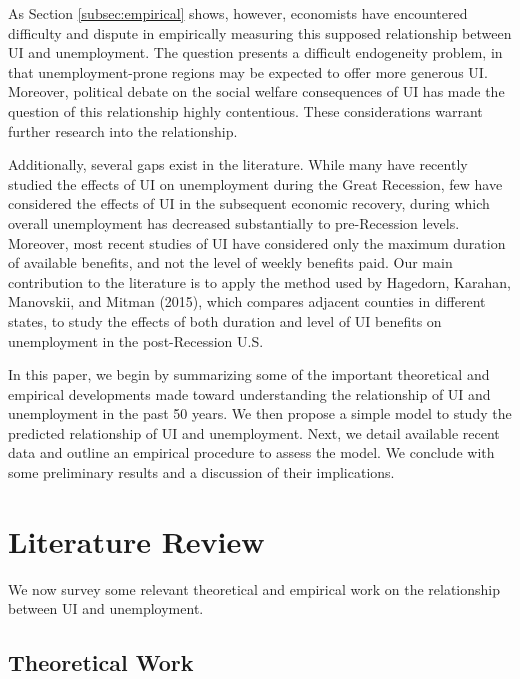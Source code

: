 \documentclass[12pt]{article}
\begin{document}
As Section \ref{subsec:empirical} shows, however, economists have encountered difficulty and dispute in empirically measuring this supposed relationship between UI and unemployment. The question presents a difficult endogeneity problem, in that unemployment-prone regions may be expected to offer more generous UI. Moreover, political debate on the social welfare consequences of UI has made the question of this relationship highly contentious. These considerations warrant further research into the relationship.

Additionally, several gaps exist in the literature. While many have recently studied the effects of UI on unemployment during the Great Recession, few have considered the effects of UI in the subsequent economic recovery, during which overall unemployment has decreased substantially to pre-Recession levels. Moreover, most recent studies of UI have considered only the maximum duration of available benefits, and not the level of weekly benefits paid. Our main contribution to the literature is to apply the method used by Hagedorn, Karahan, Manovskii, and Mitman (2015), which compares adjacent counties in different states, to study the effects of both duration and level of UI benefits on unemployment in the post-Recession U.S.

In this paper, we begin by summarizing some of the important theoretical and empirical developments made toward understanding the relationship of UI and unemployment in the past 50 years. We then propose a simple model to study the predicted relationship of UI and unemployment. Next, we detail available recent data and outline an empirical procedure to assess the model. We conclude with some preliminary results and a discussion of their implications.



\section{Literature Review \label{sec:litreview}}

We now survey some relevant theoretical and empirical work on the relationship between UI and unemployment.

\subsection{Theoretical Work \label{subsec:theoretical}}
\end{document}
